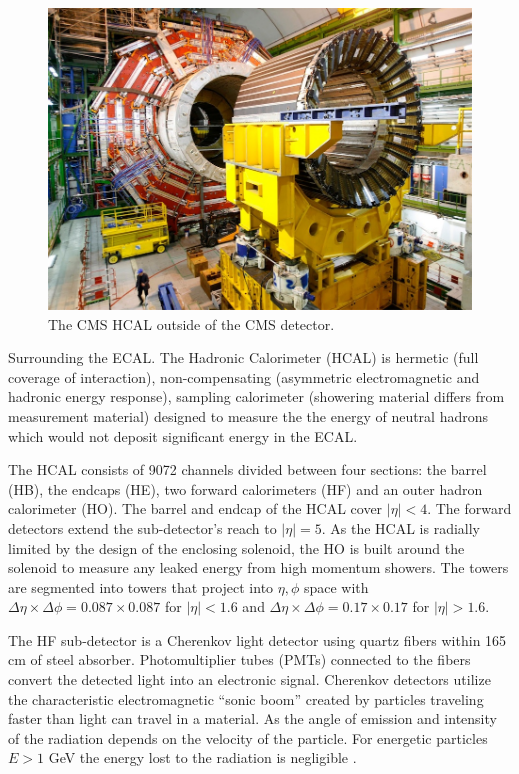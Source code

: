 \begin{figure}
\begin{center}
\includegraphics[width=.65\textwidth]{pics/naked_hcal}
\end{center}
\caption{The CMS HCAL outside of the CMS detector.}
\label{fig:hcal_naked}
\end{figure}
Surrounding the ECAL. The Hadronic Calorimeter (HCAL) is hermetic (full coverage of interaction), non-compensating (asymmetric electromagnetic and hadronic energy response), sampling calorimeter (showering material differs from measurement material) designed to measure the the energy of neutral hadrons which would not deposit significant energy in the ECAL. 

The HCAL consists of 9072 channels divided between four sections: the barrel (HB), the endcaps (HE), 
two forward calorimeters (HF) and an outer hadron calorimeter (HO). The barrel
 and endcap of the HCAL cover $|\eta| < 4$. The forward detectors extend the sub-detector's reach to $|\eta| =5$. 
As the HCAL is radially limited by the design of the enclosing solenoid, 
the HO is built around the solenoid to measure any leaked energy from high momentum showers. 
The towers are segmented into towers that project into $\eta,\phi$ space with
 $\Delta \eta \times\Delta \phi= 0.087 \times 0.087$ for $|\eta| < 1.6$ and 
$\Delta \eta \times\Delta \phi= 0.17 \times 0.17$ for $|\eta| > 1.6$. 

The HF sub-detector is a Cherenkov light detector using quartz fibers within 165 cm of steel absorber. 
Photomultiplier tubes (PMTs) connected to the fibers convert the detected light into an electronic signal.
 Cherenkov detectors utilize the characteristic electromagnetic ``sonic boom'' created by particles traveling
 faster than light can travel in a material. As the angle of emission and intensity of the
 radiation depends on the velocity of the particle. For energetic
particles $E>1$ GeV the energy lost to the radiation is negligible \cite{detectorbook}.

